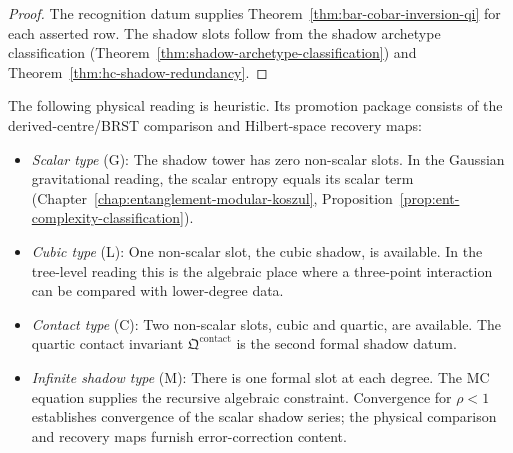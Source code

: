 \begin{proof}
The recognition datum supplies Theorem~\ref{thm:bar-cobar-inversion-qi}
for each asserted row.  The shadow slots follow from
the shadow archetype classification
(Theorem~\ref{thm:shadow-archetype-classification}) and
Theorem~\ref{thm:hc-shadow-redundancy}.
\end{proof}

\begin{remark}
\label{rem:hc-gravitational-code-complexity}
The following physical reading is heuristic.  Its promotion package
consists of the derived-centre/BRST comparison and Hilbert-space
recovery maps:
\begin{itemize}
\item \emph{Scalar type} (G):
 The shadow tower has zero non-scalar slots.  In the Gaussian
 gravitational reading, the scalar entropy equals its scalar term
 (Chapter~\ref{chap:entanglement-modular-koszul},
 Proposition~\ref{prop:ent-complexity-classification}).

\item \emph{Cubic type} (L):
 One non-scalar slot, the cubic shadow, is available.  In the
 tree-level reading this is the algebraic place where a three-point
 interaction can be compared with lower-degree data.

\item \emph{Contact type} (C):
 Two non-scalar slots, cubic and quartic, are available.
 The quartic contact invariant
 $\mathfrak{Q}^{\mathrm{contact}}$
 is the second formal shadow datum.

\item \emph{Infinite shadow type} (M):
 There is one formal slot at each degree.  The MC equation supplies
 the recursive algebraic constraint.  Convergence for $\rho<1$
 establishes convergence of the scalar shadow series; the physical
 comparison and recovery maps furnish error-correction content.
\end{itemize}
\end{remark}
